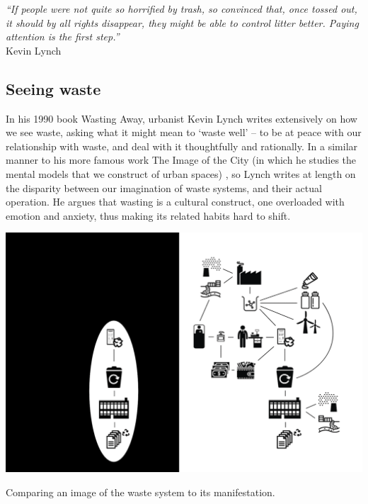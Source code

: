 \documentclass[nofonts,nols,justified,nobib]{tufte-book}
\begin{document}

\begin{flushright}
\begin{minipage}[b]{0.8\textwidth}
\begin{flushright}
\emph{``If people were not quite so horrified by trash, so convinced that, 
once tossed out, it should by all rights disappear, they might be able to 
control litter better. Paying attention is the first step.''} \cite{lynch_wasting_1990} \\
Kevin Lynch
\end{flushright}
\end{minipage}
\end{flushright}


\subsection*{Seeing waste}

In his 1990 book Wasting Away\cite{lynch_wasting_1990}, urbanist Kevin Lynch writes extensively on how we see waste, asking what it might mean to `waste well' -- to be at peace with our relationship with waste, and deal with it thoughtfully and rationally. In a similar manner to his more famous work The Image of the City (in which he studies the mental models that we construct of urban spaces) \cite{lynch_image_1960}, so Lynch writes at length on the disparity between our imagination of waste systems, and their actual operation. He argues that wasting is a cultural construct, one overloaded with emotion and anxiety, thus making its related habits hard to shift. 


\begin{marginfigure}
\includegraphics[width=\textwidth]{img/1/waste-complexity.png}
\caption{Comparing an image of the waste system to its manifestation. \cite{liboiron_why_2014} \label{b}}
\end{marginfigure}
\end{document}
